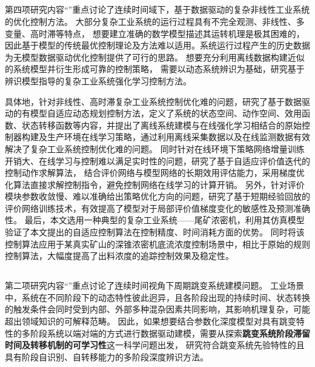 \subsection{\TitlechapterIII}
第四项研究内容“\TitlechapterIII”重点讨论了连续时间域下，基于数据驱动的复杂非线性工业系统的优化控制方法。
大部分复杂工业系统的运行过程具有不完全观测、非线性、多变量、高时滞等特点，
想要建立准确的数学模型描述其运转机理是极其困难的，因此基于模型的传统最优控制理论及方法难以适用。系统运行过程产生的历史数据为无模型数据驱动优化控制提供了可行的思路。
想要充分利用离线数据构建近似的系统模型并衍生形成可靠的控制策略，
需要以动态系统辨识为基础，研究基于辨识模型指导的复杂工业系统强化学习控制方法。

具体地，针对非线性、高时滞复杂工业系统控制优化难的问题，研究了基于数据驱动的有模型自适应动态规划控制方法，定义了系统的状态空间、动作空间、效用函数、状态转移函数等内容，并提出了离线系统建模与在线强化学习相结合的原始控制器构建及生产环境在线学习策略，通过利用离线采集数据以及在线监测数据有效解决了复杂工业系统控制优化难的问题。
同时针对在线环境下策略网络增量训练开销大、在线学习与控制难以满足实时性的问题，研究了基于自适应评价值迭代的控制动作求解算法，
结合评价网络与模型网络的长期效用评估能力，采用梯度优化算法直接求解控制指令，避免控制网络在线学习的计算开销。
另外，针对评价模块参数收敛慢、难以准确给出策略优化方向的问题，研究了基于短期经验回放的评价网络训练技术，有效提高了模型对于局部评价值梯度变化的敏感性及预测准确性。
最后，本文选用一种典型的复杂工业系统——尾矿浓密机，利用其仿真模型验证了本文提出的自适应控制算法在控制精度、时间消耗方面的优势。
同时将该控制算法应用于某真实矿山的深锥浓密机底流浓度控制场景中，相比于原始的规则控制算法，大幅度提高了出料浓度的追踪控制效果及稳定性。

\subsection{\TitlechapterIV}


第二项研究内容“\TitlechapterIV”重点讨论了连续时间视角下周期跳变系统建模问题。
工业场景中，系统在不同阶段下的动态特性彼此迥异，且各阶段出现的持续时间、状态转换的触发条件会同时受到内部、外部多种混杂因素共同影响，其影响机理复杂，可能超出领域知识的可解释范畴。
因此，如果想要结合参数化深度模型对具有跳变特性的多阶段系统以端对端的方式进行数据驱动建模，需要从探索\textbf{跳变系统阶段滞留时间及转移机制的可学习性}这一科学问题出发，
研究符合跳变系统先验特性的且具有阶段自识别、自转移能力的多阶段深度辨识方法。

